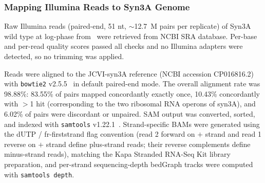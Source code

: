 
\subsubsection{Mapping Illumina Reads to Syn3A Genome}

Raw Illumina reads (paired-end, 51 nt, $\sim$12.7~M pairs per replicate) of Syn3A wild type at log-phase from~\cite{sandberg_adaptive_2023} were retrieved from NCBI SRA database.
Per-base and per-read quality scores passed all checks and no Illumina adapters were detected, so no trimming was applied.


Reads were aligned to the JCVI-syn3A reference (NCBI accession CP016816.2) with \texttt{bowtie2} v2.5.5~\cite{langmead_fast_2012} in default paired-end mode.
The overall alignment rate was 98.88\%: 83.55\% of pairs mapped concordantly exactly once, 10.43\% concordantly with $>$1 hit (corresponding to the two ribosomal RNA operons of syn3A), and 6.02\% of pairs were discordant or unpaired.
SAM output was converted, sorted, and indexed with \texttt{samtools} v1.22.1~\cite{li_sequence_2009}.
Strand-specific BAMs were generated using the dUTP / fr-firststrand flag convention (read 2 forward on $+$ strand and read 1 reverse on $+$ strand define plus-strand reads; their reverse complements define minus-strand reads), matching the Kapa Stranded RNA-Seq Kit library preparation, and per-strand sequencing-depth bedGraph tracks were computed with \texttt{samtools depth}.

